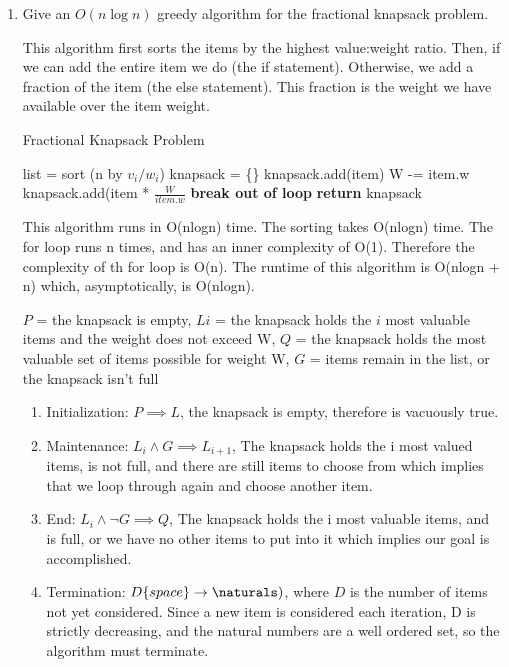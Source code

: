 \documentclass{article}
\begin{document}
\begin{enumerate}
    \item Give an $O(n\log n)$ greedy algorithm for the fractional knapsack problem.
      
This algorithm first sorts the items by the highest value:weight ratio. Then, if we can add the entire item we do (the if statement). Otherwise, we add a fraction of the item (the else statement). This fraction is the weight we have available over the item weight. 

\begin{algorithm}
    \caption{Fractional Knapsack Problem}\label{fracKnap}
    \begin{algorithmic}[1]
      \State list = sort (n by $v_i/w_i$)
      \State knapsack = \{\}
      		\State knapsack.add(item)
      		\State W -= item.w
      	\Else
      		\State knapsack.add(item * $\frac{W}{item.w}$
      		\State \textbf{break out of loop}
      	\EndIf
      \EndFor
      \State \textbf{return} knapsack
    \EndFunction
    \end{algorithmic}
\end{algorithm} 

This algorithm runs in O(nlogn) time. The sorting takes O(nlogn) time. The for loop runs n times, and has an inner complexity of O(1). Therefore the complexity of th for loop is O(n). The runtime of this algorithm is O(nlogn + n) which, asymptotically, is O(nlogn). 

$P$ = the knapsack is empty, $Li$ = the knapsack holds the $i$ most valuable items and the weight does not exceed W, $Q$ = the knapsack holds the most valuable set of items possible for weight W, $G$ = items remain in the list, or the knapsack isn't full
    \begin{enumerate}
        \item Initialization: $P \implies L$, the knapsack is empty, therefore is vacuously true.
        \item Maintenance: $L_{i} \land G \implies L_{i+1}$, The knapsack holds the i most valued items, is not full, and there are still items to choose from which implies that we loop through again and choose another item.
        \item End: $L_{i} \land \neg G \implies Q$, The knapsack holds the i most valuable items, and is full, or we have no other items to put into it which implies our goal is accomplished.
        \item Termination: $D\{space\} \rightarrow \naturals)$, where $D$ is the number of items not yet considered. Since a new item is considered each iteration, D is strictly decreasing, and the natural numbers are a well ordered set, so the algorithm must terminate.
    \end{enumerate}
    

\end{enumerate}
\end{document}
